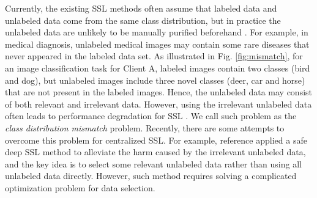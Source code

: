 \documentclass[twoside,journal]{IEEEtran}
\begin{document}
Currently, the existing SSL methods often assume that labeled data and unlabeled data come from the same class distribution, but in practice the unlabeled data are unlikely to be manually purified beforehand \cite{chen2020semi}. For example, in
medical diagnosis, unlabeled medical
images may contain some rare diseases  that never appeared in the labeled data set.  As
illustrated in Fig. \ref{fig:mismatch}, for an image classification task for Client A, labeled images contain two classes (bird and dog),  but unlabeled images include three novel classes (deer, car and horse) that are not present in the labeled images.  Hence, the unlabeled data may consist of both relevant and irrelevant data. However, using the irrelevant unlabeled data often leads to  performance degradation for SSL \cite{oliver2018realistic}. We call such problem as the \emph{class distribution mismatch} problem. Recently, there are some
attempts to overcome this problem for centralized SSL. For example, reference \cite{guo2020safe} applied a  safe deep
SSL method to alleviate the harm caused by the irrelevant unlabeled data, and the key idea is to select some relevant unlabeled data rather than using all unlabeled data directly. However, such method requires solving a complicated optimization problem for data selection.
\end{document}
